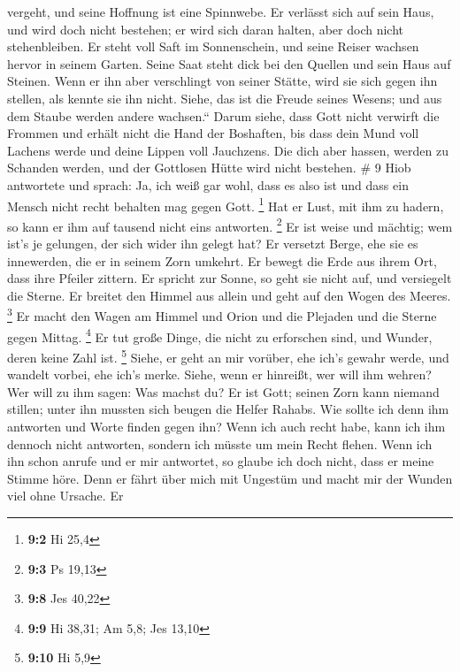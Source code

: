 vergeht, und seine Hoffnung ist eine Spinnwebe.  Er
verlässt sich auf sein Haus, und wird doch nicht bestehen; er wird sich
daran halten, aber doch nicht stehenbleiben.  Er steht voll
Saft im Sonnenschein, und seine Reiser wachsen hervor in seinem Garten.
 Seine Saat steht dick bei den Quellen und sein Haus auf
Steinen.  Wenn er ihn aber verschlingt von seiner Stätte,
wird sie sich gegen ihn stellen, als kennte sie ihn nicht. 
Siehe, das ist die Freude seines Wesens; und aus dem Staube werden
andere wachsen.``  Darum siehe, dass Gott nicht verwirft
die Frommen und erhält nicht die Hand der Boshaften,  bis
dass dein Mund voll Lachens werde und deine Lippen voll Jauchzens.
 Die dich aber hassen, werden zu Schanden werden, und der
Gottlosen Hütte wird nicht bestehen. \# 9  Hiob antwortete
und sprach:  Ja, ich weiß gar wohl, dass es also ist und
dass ein Mensch nicht recht behalten mag gegen Gott. \footnote{\textbf{9:2}
  Hi 25,4}  Hat er Lust, mit ihm zu hadern, so kann er ihm
auf tausend nicht eins antworten. \footnote{\textbf{9:3} Ps 19,13}
 Er ist weise und mächtig; wem ist's je gelungen, der sich
wider ihn gelegt hat?  Er versetzt Berge, ehe sie es
innewerden, die er in seinem Zorn umkehrt.  Er bewegt die
Erde aus ihrem Ort, dass ihre Pfeiler zittern.  Er spricht
zur Sonne, so geht sie nicht auf, und versiegelt die Sterne.
 Er breitet den Himmel aus allein und geht auf den Wogen des
Meeres. \footnote{\textbf{9:8} Jes 40,22}  Er macht den
Wagen am Himmel und Orion und die Plejaden und die Sterne gegen Mittag.
\footnote{\textbf{9:9} Hi 38,31; Am 5,8; Jes 13,10}  Er tut
große Dinge, die nicht zu erforschen sind, und Wunder, deren keine Zahl
ist. \footnote{\textbf{9:10} Hi 5,9}  Siehe, er geht an mir
vorüber, ehe ich's gewahr werde, und wandelt vorbei, ehe ich's merke.
 Siehe, wenn er hinreißt, wer will ihm wehren? Wer will zu
ihm sagen: Was machst du?  Er ist Gott; seinen Zorn kann
niemand stillen; unter ihn mussten sich beugen die Helfer Rahabs.
 Wie sollte ich denn ihm antworten und Worte finden gegen
ihn?  Wenn ich auch recht habe, kann ich ihm dennoch nicht
antworten, sondern ich müsste um mein Recht flehen.  Wenn
ich ihn schon anrufe und er mir antwortet, so glaube ich doch nicht,
dass er meine Stimme höre.  Denn er fährt über mich mit
Ungestüm und macht mir der Wunden viel ohne Ursache.  Er

